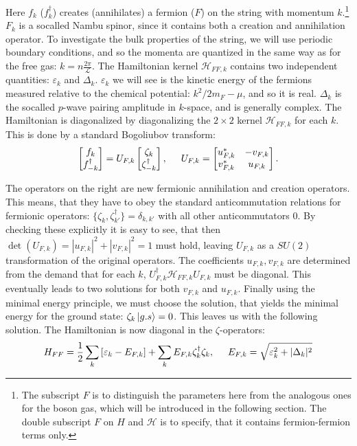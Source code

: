 Here $f_k$ ($f_k^\dagger$) creates (annihilates) a fermion ($F$) on the string with momentum $k$.\footnote{The subscript $F$ is to distinguish the parameters here from the analogous ones for the boson gas, which will be introduced in the following section. The double subscript $F$ on $H$ and $\mathcal{H}$ is to specify, that it contains fermion-fermion terms only.} $F_k$ is a socalled Nambu spinor, since it contains both a creation and annihilation operator. To investigate the bulk properties of the string, we will use periodic boundary conditions, and so the momenta are quantized in the same way as for the free gas: $k = n\frac{2\pi}{\mathcal{L}}$. The Hamiltonian kernel $\mathcal{H}_{FF,k}$ contains two independent quantities: $\varepsilon_k$ and $\Delta_k$. $\varepsilon_k$ we will see is the kinetic energy of the fermions measured relative to the chemical potential: $k^2/2m_F-\mu$, and so it is real. $\Delta_k$ is the socalled $p$-wave pairing amplitude in $k$-space, and is generally complex. The Hamiltonian is diagonalized by diagonalizing the $2\times 2$ kernel $\mathcal{H}_{FF,k}$ for each $k$. This is done by a standard Bogoliubov transform: 
\begin{equation}
 \begin{bmatrix} f_k \\ f_{-k}^\dagger \end{bmatrix} = U_{F,k} \begin{bmatrix} \zeta_k \\ \zeta^\dagger_{-k} \end{bmatrix}, \hspace{0.5cm} U_{F,k} = \begin{bmatrix} u^*_{F,k} & -v_{F,k} \\ v^*_{F,k} & u_{F,k} \end{bmatrix}. 
 \label{eq.fermionquasiparticledef}
\end{equation}

The operators on the right are new fermionic annihilation and creation operators. This means, that they have to obey the standard anticommutation relations for fermionic operators: $\{\zeta_k,\zeta_{k'}^\dagger \} = \delta_{k,k'}$ with all other anticommutators 0. By checking these explicitly it is easy to see, that then $\det(U_{F,k}) = |u_{F,k}|^2+|v_{F,k}|^2 = 1$ must hold, leaving $U_{F,k}$ as a $SU(2)$ transformation of the original operators. The coefficients $u_{F,k}, v_{F,k}$ are determined from the demand that for each $k$, $U^\dagger_{F,k} \mathcal{H}_{FF,k}U_{F,k}$ must be diagonal. This eventually leads to two solutions for both $v_{F,k}$ and $u_{F,k}$. Finally using the minimal energy principle, we must choose the solution, that yields the minimal energy for the ground state: $\zeta_k\ket{g.s} = 0$. This leaves us with the following solution. The Hamiltonian is now diagonal in the $\zeta$-operators: 
\begin{equation}
H_{FF} = \frac{1}{2}\sum_k \left[\varepsilon_k-E_{F,k}\right] + \sum_k E_{F,k} \zeta^\dagger_k \zeta_k, \hspace{0.5cm} E_{F,k} = \sqrt{\varepsilon_k^2 + |\Delta_k|^2}
\label{eq.Kitaev.H_diagonalpre}
\end{equation}

